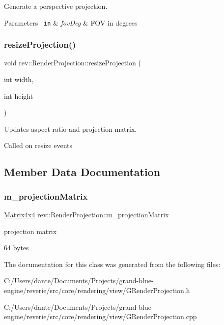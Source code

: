 Generate a perspective projection. 


\begin{DoxyParams}[1]{Parameters}
\mbox{\texttt{ in}}  & {\em fov\+Deg} & F\+OV in degrees \\
\hline
\end{DoxyParams}
\mbox{\label{classrev_1_1_render_projection_ae8f4a509e0244639be2b2c94b75549b7}} 
\subsubsection{\texorpdfstring{resizeProjection()}{resizeProjection()}}
{\footnotesize\ttfamily void rev\+::\+Render\+Projection\+::resize\+Projection (\begin{DoxyParamCaption}\item[{int}]{width,  }\item[{int}]{height }\end{DoxyParamCaption})}



Updates aspect ratio and projection matrix. 

Called on resize events 

\subsection{Member Data Documentation}
\mbox{\label{classrev_1_1_render_projection_ae00290a86c36083452ae9000745b9451}} 
\subsubsection{\texorpdfstring{m\_projectionMatrix}{m\_projectionMatrix}}
{\footnotesize\ttfamily \mbox{\hyperlink{classrev_1_1_square_matrix}{Matrix4x4}} rev\+::\+Render\+Projection\+::m\+\_\+projection\+Matrix\hspace{0.3cm}{\ttfamily [protected]}}



projection matrix 

64 bytes 

The documentation for this class was generated from the following files\+:\begin{DoxyCompactItemize}
\item 
C\+:/\+Users/dante/\+Documents/\+Projects/grand-\/blue-\/engine/reverie/src/core/rendering/view/G\+Render\+Projection.\+h\item 
C\+:/\+Users/dante/\+Documents/\+Projects/grand-\/blue-\/engine/reverie/src/core/rendering/view/G\+Render\+Projection.\+cpp\end{DoxyCompactItemize}
